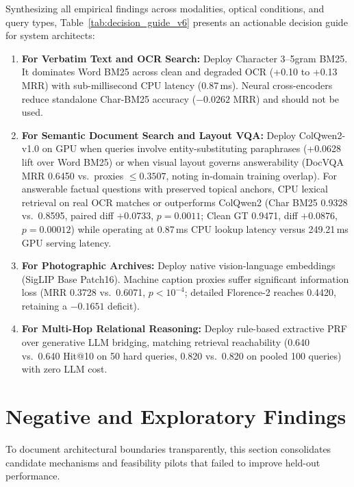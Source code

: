 Synthesizing all empirical findings across modalities, optical conditions, and query types, Table~\ref{tab:decision_guide_v6} presents an actionable decision guide for system architects:
\begin{enumerate}
    \setlength{\itemsep}{0pt}
    \setlength{\parskip}{0pt}
    \setlength{\parsep}{0pt}
    \setlength{\topsep}{1pt}
    \item \textbf{For Verbatim Text and OCR Search:} Deploy Character 3--5gram BM25. It dominates Word BM25 across clean and degraded OCR (+0.10 to +0.13 MRR) with sub-millisecond CPU latency (0.87\,ms). Neural cross-encoders reduce standalone Char-BM25 accuracy ($-0.0262$ MRR) and should not be used.
    \item \textbf{For Semantic Document Search and Layout VQA:} Deploy ColQwen2-v1.0 on GPU when queries involve entity-substituting paraphrases (+0.0628 lift over Word BM25) or when visual layout governs answerability (DocVQA MRR 0.6450 vs.\ proxies $\le 0.3507$, noting in-domain training overlap). For answerable factual questions with preserved topical anchors, CPU lexical retrieval on real OCR matches or outperforms ColQwen2 (Char BM25 0.9328 vs.\ 0.8595, paired diff $+0.0733$, $p = 0.0011$; Clean GT 0.9471, diff $+0.0876$, $p=0.00012$) while operating at 0.87\,ms CPU lookup latency versus 249.21\,ms GPU serving latency.
    \item \textbf{For Photographic Archives:} Deploy native vision-language embeddings (SigLIP Base Patch16). Machine caption proxies suffer significant information loss (MRR 0.3728 vs.\ 0.6071, $p < 10^{-4}$; detailed Florence-2 reaches 0.4420, retaining a $-0.1651$ deficit).
    \item \textbf{For Multi-Hop Relational Reasoning:} Deploy rule-based extractive PRF over generative LLM bridging, matching retrieval reachability (0.640 vs.\ 0.640 Hit@10 on 50 hard queries, 0.820 vs.\ 0.820 on pooled 100 queries) with zero LLM cost.
\end{enumerate}

\section{Negative and Exploratory Findings}
\label{sec:negative_findings}

To document architectural boundaries transparently, this section consolidates candidate mechanisms and feasibility pilots that failed to improve held-out performance.

